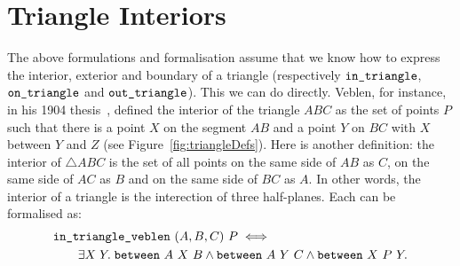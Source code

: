 
\section{Triangle Interiors}\label{sec:TriangleInteriorDefinition}

The above formulations and formalisation assume that we know how to express the interior, exterior and boundary of a triangle (respectively $\texttt{in\_triangle}$, $\texttt{on\_triangle}$ and $\texttt{out\_triangle}$). This we can do directly. Veblen, for instance, in his 1904 thesis~\cite{Veblenphd}, defined the interior of the triangle $ABC$ as the set of points $P$ such that there is a point $X$ on the segment $AB$ and a point $Y$ on $BC$ with $X$ between $Y$ and $Z$ (see Figure~\ref{fig:triangleDefs}). Here is another definition: the interior of $\triangle ABC$ is the set of all points on the same side of $AB$ as $C$, on the same side of $AC$ as $B$ and on the same side of $BC$ as $A$. In other words, the interior of a triangle is the interection of three half-planes. Each can be formalised as:
\begin{equation*}
\begin{split}
  &\texttt{in\_triangle\_veblen}\ (A,B,C)\ P \iff\\
  &\qquad\exists X\; Y.\; \texttt{between}\ A\ X\ B \wedge \texttt{between}\ A\ Y\ C \wedge \texttt{between}\ X\ P\ Y.
\end{split}
\end{equation*}

